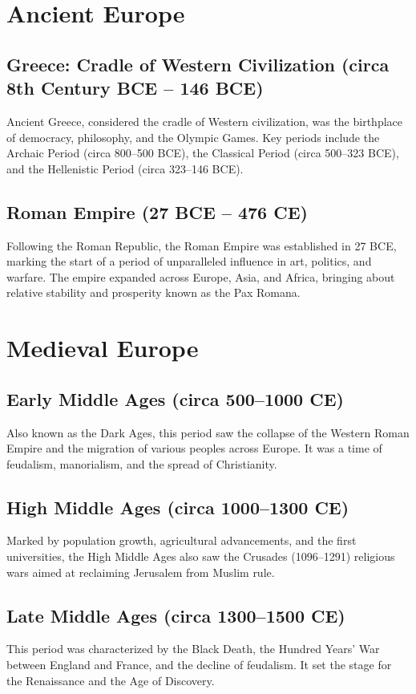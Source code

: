 \documentclass[a4paper,12pt]{book}
\begin{document}
\section{Ancient Europe}
\label{sec:ancient-europe}
\subsection{Greece: Cradle of Western Civilization (circa 8th Century BCE – 146 BCE)}
Ancient Greece, considered the cradle of Western civilization, was the birthplace of democracy, philosophy, and the Olympic Games. Key periods include the Archaic Period (circa 800–500 BCE), the Classical Period (circa 500–323 BCE), and the Hellenistic Period (circa 323–146 BCE).

\subsection{Roman Empire (27 BCE – 476 CE)}
Following the Roman Republic, the Roman Empire was established in 27 BCE, marking the start of a period of unparalleled influence in art, politics, and warfare. The empire expanded across Europe, Asia, and Africa, bringing about relative stability and prosperity known as the Pax Romana.

\section{Medieval Europe}
\label{sec:medieval-europe}
\subsection{Early Middle Ages (circa 500–1000 CE)}
Also known as the Dark Ages, this period saw the collapse of the Western Roman Empire and the migration of various peoples across Europe. It was a time of feudalism, manorialism, and the spread of Christianity.

\subsection{High Middle Ages (circa 1000–1300 CE)}
Marked by population growth, agricultural advancements, and the first universities, the High Middle Ages also saw the Crusades (1096–1291) religious wars aimed at reclaiming Jerusalem from Muslim rule.

\subsection{Late Middle Ages (circa 1300–1500 CE)}
This period was characterized by the Black Death, the Hundred Years' War between England and France, and the decline of feudalism. It set the stage for the Renaissance and the Age of Discovery.
\end{document}

